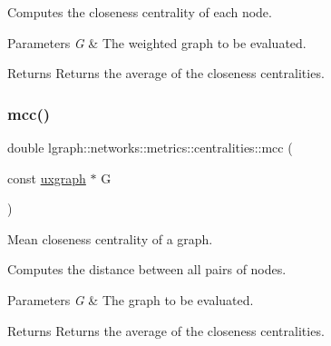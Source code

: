 Computes the closeness centrality of each node.


\begin{DoxyParams}{Parameters}
{\em G} & The weighted graph to be evaluated. \\
\hline
\end{DoxyParams}
\begin{DoxyReturn}{Returns}
Returns the average of the closeness centralities. 
\end{DoxyReturn}
\mbox{\label{namespacelgraph_1_1networks_1_1metrics_1_1centralities_a3321a941646c6958c695198b1efcbe13}} 
\subsubsection{\texorpdfstring{mcc()}{mcc()}\hspace{0.1cm}{\footnotesize\ttfamily [2/4]}}
{\footnotesize\ttfamily double lgraph\+::networks\+::metrics\+::centralities\+::mcc (\begin{DoxyParamCaption}\item[{const \hyperlink{classlgraph_1_1uxgraph}{uxgraph} $\ast$}]{G }\end{DoxyParamCaption})}



Mean closeness centrality of a graph. 

Computes the distance between all pairs of nodes. 
\begin{DoxyParams}{Parameters}
{\em G} & The graph to be evaluated. \\
\hline
\end{DoxyParams}
\begin{DoxyReturn}{Returns}
Returns the average of the closeness centralities. 
\end{DoxyReturn}
\mbox{\label{namespacelgraph_1_1networks_1_1metrics_1_1centralities_af66da53eb48ccb2982bd97246a651f00}} 
